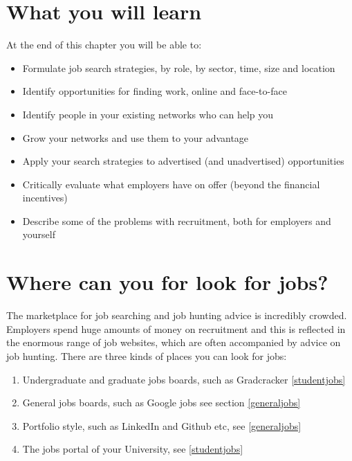 \documentclass[
]{book}
\providecommand{\tightlist}{%
  \setlength{\itemsep}{0pt}\setlength{\parskip}{0pt}}
\begin{document}
\hypertarget{ilo8}{%
\section{What you will learn}\label{ilo8}}

At the end of this chapter you will be able to:

\begin{itemize}
\tightlist
\item
  Formulate job search strategies, by role, by sector, time, size and location
\item
  Identify opportunities for finding work, online and face-to-face
\item
  Identify people in your existing networks who can help you
\item
  Grow your networks and use them to your advantage
\item
  Apply your search strategies to advertised (and unadvertised) opportunities
\item
  Critically evaluate what employers have on offer (beyond the financial incentives)
\item
  Describe some of the problems with recruitment, both for employers and yourself
\end{itemize}

\hypertarget{looking}{%
\section{Where can you for look for jobs?}\label{looking}}

The marketplace for job searching and job hunting advice is incredibly crowded. Employers spend huge amounts of money on recruitment and this is reflected in the enormous range of job websites, which are often accompanied by advice on job hunting. There are three kinds of places you can look for jobs:

\begin{enumerate}
\def\labelenumi{\arabic{enumi}.}
\tightlist
\item
  Undergraduate and graduate jobs boards, such as Gradcracker \ref{studentjobs}
\item
  General jobs boards, such as Google jobs see section \ref{generaljobs}
\item
  Portfolio style, such as LinkedIn and Github etc, see \ref{generaljobs}
\item
  The jobs portal of your University, see \ref{studentjobs}
\end{enumerate}
\end{document}
